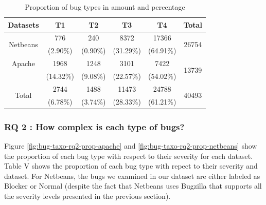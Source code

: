 \begin{table}[h!]
\centering

\begin{tabular}{c|c|c|c|c|c}
Datasets                  & T1        & T2       & T3        & T4        & Total                  \\ \hline \hline
\multirow{2}{*}{Netbeans} & 776       & 240      & 8372      & 17366     & \multirow{2}{*}{26754} \\
                          & (2.90\%)  & (0.90\%) & (31.29\%) & (64.91\%) &                        \\ \hline
Apache                    & 1968      & 1248     & 3101      & 7422      & \multirow{2}{*}{13739} \\
                          & (14.32\%) & (9.08\%) & (22.57\%) & (54.02\%) &                        \\ \hline
\multirow{2}{*}{Total}    & 2744      & 1488     & 11473     & 24788     & \multirow{2}{*}{40493} \\
                          & (6.78\%)  & (3.74\%) & (28.33\%) & (61.21\%) & \\ \hline \hline                      
\end{tabular}
\caption{Proportion of bug types in amount and percentage}
\label{tab:bug-taxo-rq1-prop}
\end{table}


\noindent{}

\subsubsection{RQ 2 : How complex is each type of bugs?}

Figure \ref{fig:bug-taxo-rq2-prop-apache} and \ref{fig:bug-taxo-rq2-prop-netbeans} show the proportion of each bug type with
respect to their severity for each dataset. Table V shows the
proportion of each bug type with repect to their severity and
dataset. For Netbeans, the bugs we examined in our dataset
are either labeled as Blocker or Normal (despite the fact that
Netbeans uses Bugzilla that supports all the severity levels
presented in the previous section).

